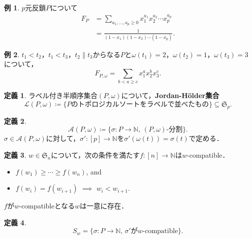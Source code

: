 \documentclass[xelatex,ja=standard,a4paper,14pt,everyparhook=compat]{bxjsarticle}
\newcommand{\bbN}{\mathbb{N}}
\newcommand{\mkS}{\mathfrak{S}}
\newcommand{\mcA}{\mathcal{A}}
\newcommand{\mcL}{\mathcal{L}}
\theoremstyle{definition}
\newtheorem*{example}{例}
\newtheorem*{definition}{定義}
\begin{document}
\begin{example}
    $p$元反鎖$P$について \begin{align*}
        F_P & = \sum_{a_1,\ldots,a_p \geq 0} x_1^{a_1} x_2^{a_2} \cdots x_p^{a_p} \\
            & = \frac{1}{(1-x_1)(1-x_2)\cdots(1-x_p)}.
    \end{align*}
\end{example}

\begin{example}
    $t_1 < t_2$，$t_1 < t_3$，$t_2 \parallel t_3$からなる$P$と$\omega(t_1) = 2$，$\omega(t_2)=1$，$\omega(t_3)=3$について， \begin{equation*}
        F_{P,\omega} = \sum_{b < a \geq c} x_1^a x_2^b x_3^c.
    \end{equation*}
\end{example}

\begin{definition}
    ラベル付き半順序集合$(P,\omega)$について，\textbf{Jordan-H\"older集合} \begin{equation*}
        \mcL(P, \omega) \coloneqq \{\text{$P$のトポロジカルソートをラベルで並べたもの}\} \subseteq \mkS_p.
    \end{equation*}
\end{definition}

\begin{definition}
    \begin{equation*}
        \mcA(P,\omega) \coloneqq \{\sigma : \text{$P \to \bbN$, $(P,\omega)$-分割}\}.
    \end{equation*}
    $\sigma \in \mcA(P,\omega)$に対して，$\sigma' : [p] \to \bbN$を$\sigma'(\omega(t)) = \sigma(t)$で定める．
\end{definition}

\begin{definition}
    $w \in \mkS_n$について，次の条件を満たす$f : [n] \to \bbN$は$w$-compatible． \begin{itemize}
        \item $f(w_1) \geq \cdots \geq f(w_n)$, and
        \item $f(w_i) = f(w_{i+1})$ $\implies$ $w_i < w_{i+1}$.
    \end{itemize}
    $f$が$w$-compatibleとなる$w$は一意に存在．
\end{definition}

\begin{definition}
    \begin{equation*}
        S_w = \{\sigma : \text{$P \to \bbN$, $\sigma'$が$w$-compatible}\}.
    \end{equation*}
\end{definition}
\end{document}
